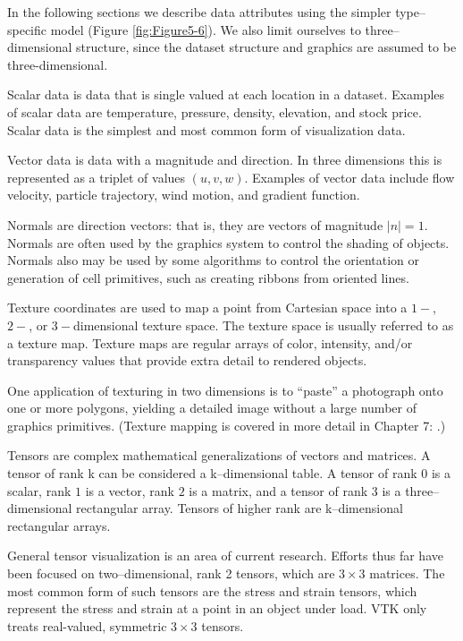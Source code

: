 In the following sections we describe data attributes using the simpler type--specific model (Figure \ref{fig:Figure5-6}). We also limit ourselves to three--dimensional structure, since the dataset structure and graphics are assumed to be three-dimensional.

\begin{description}[leftmargin=0cm,labelindent=0cm]

\item[Scalars.\index{dataset attributes!scalars}] Scalar data is data that is single valued at each location in a dataset. Examples of scalar data are temperature, pressure, density, elevation, and stock price. Scalar data is the simplest and most common form of visualization data.

\item[Vectors.\index{dataset attributes!vectors}] Vector data is data with a magnitude and direction. In three dimensions this is represented as a triplet of values $(u, v, w)$. Examples of vector data include flow velocity, particle trajectory, wind motion, and gradient function.

\item[Normals.\index{dataset attributes!normals}] Normals are direction vectors: that is, they are vectors of magnitude $|n|=1$. Normals are often used by the graphics system to control the shading of objects. Normals also may be used by some algorithms to control the orientation or generation of cell primitives, such as creating ribbons from oriented lines.

\item[Texture Coordinates.\index{dataset attributes!texture coordinates}] Texture coordinates are used to map a point from Cartesian space into a $1-$, $2-$, or $3-$dimensional texture space. The texture space is usually referred to as a texture map. Texture maps are regular arrays of color, intensity, and/or transparency values that provide extra detail to rendered objects.

One application of texturing in two dimensions is to ``paste'' a photograph onto one or more polygons, yielding a detailed image without a large number of graphics primitives. (Texture mapping is covered in more detail in Chapter 7:  .)

\item[Tensors.\index{dataset attributes!tensors}] Tensors are complex mathematical generalizations of vectors and matrices. A tensor of rank k can be considered a k--dimensional table. A tensor of rank $0$ is a scalar, rank $1$ is a vector, rank $2$ is a matrix, and a tensor of rank $3$ is a three--dimensional rectangular array. Tensors of higher rank are k--dimensional rectangular arrays.

General tensor visualization is an area of current research. Efforts thus far have been focused on two--dimensional, rank 2 tensors, which are $3 \times 3$ matrices. The most common form of such tensors are the stress and strain tensors, which represent the stress and strain at a point in an object under load. VTK only treats real-valued, symmetric $3 \times 3$ tensors.

\end{description}

